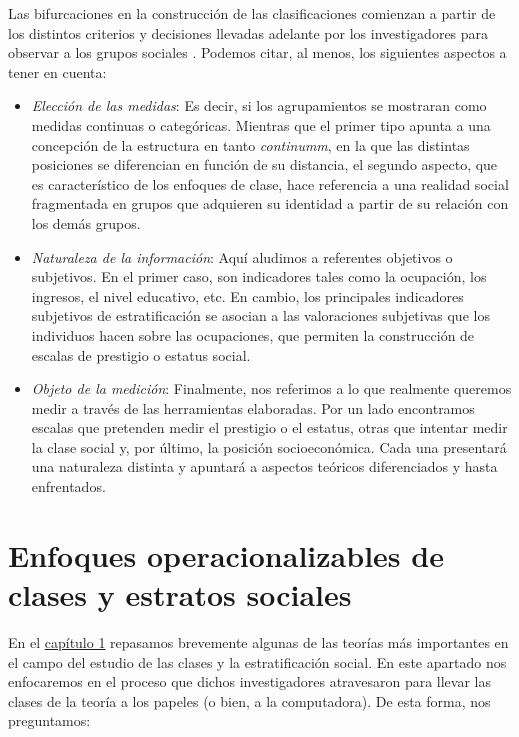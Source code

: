 \documentclass[
]{book}
\begin{document}
Las bifurcaciones en la construcción de las clasificaciones comienzan a partir de los distintos criterios y decisiones llevadas adelante por los investigadores para observar a los grupos sociales \citep[pp.~49-502]{FrancesGarcia2009}. Podemos citar, al menos, los siguientes aspectos a tener en cuenta:

\begin{itemize}
\item
  \emph{Elección de las medidas}: Es decir, si los agrupamientos se mostraran como medidas continuas o categóricas. Mientras que el primer tipo apunta a una concepción de la estructura en tanto \emph{continumm}, en la que las distintas posiciones se diferencian en función de su distancia, el segundo aspecto, que es característico de los enfoques de clase, hace referencia a una realidad social fragmentada en grupos que adquieren su identidad a partir de su relación con los demás grupos.
\item
  \emph{Naturaleza de la información}: Aquí aludimos a referentes objetivos o subjetivos. En el primer caso, son indicadores tales como la ocupación, los ingresos, el nivel educativo, etc. En cambio, los principales indicadores subjetivos de estratificación se asocian a las valoraciones subjetivas que los individuos hacen sobre las ocupaciones, que permiten la construcción de escalas de prestigio o estatus social.
\item
  \emph{Objeto de la medición}: Finalmente, nos referimos a lo que realmente queremos medir a través de las herramientas elaboradas. Por un lado encontramos escalas que pretenden medir el prestigio o el estatus, otras que intentar medir la clase social y, por último, la posición socioeconómica. Cada una presentará una naturaleza distinta y apuntará a aspectos teóricos diferenciados y hasta enfrentados.
\end{itemize}

\hypertarget{clases6}{%
\section{Enfoques operacionalizables de clases y estratos sociales}\label{clases6}}

En el \protect\hyperlink{estructura1}{capítulo 1} repasamos brevemente algunas de las teorías más importantes en el campo del estudio de las clases y la estratificación social. En este apartado nos enfocaremos en el proceso que dichos investigadores atravesaron para llevar las clases de la teoría a los papeles (o bien, a la computadora). De esta forma, nos preguntamos:
\end{document}
